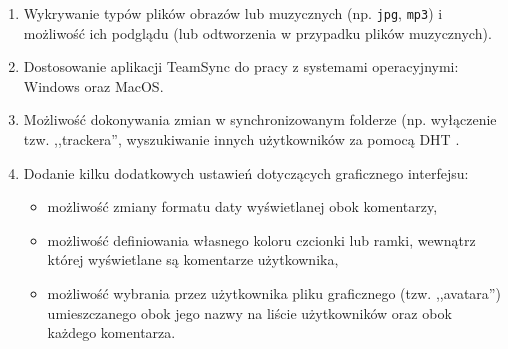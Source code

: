 \begin{enumerate}[noitemsep]
  \item Wykrywanie typów plików obrazów lub muzycznych (np. \texttt{jpg}, \texttt{mp3}) i możliwość ich podglądu (lub odtworzenia w przypadku plików muzycznych).
  
  \item Dostosowanie aplikacji TeamSync do pracy z systemami operacyjnymi: Windows oraz MacOS.
  
  \item Możliwość dokonywania zmian w synchronizowanym folderze (np. wyłączenie tzw. ,,trackera'', wyszukiwanie innych użytkowników za pomocą DHT \cite{dht}.
  
  \item Dodanie kilku dodatkowych ustawień dotyczących graficznego interfejsu:
  \begin{itemize}[noitemsep]
    \item możliwość zmiany formatu daty wyświetlanej obok komentarzy,
    \item możliwość definiowania własnego koloru czcionki lub ramki, wewnątrz której wyświetlane są komentarze użytkownika,
    \item możliwość wybrania przez użytkownika pliku graficznego (tzw. ,,avatara'') umieszczanego obok jego nazwy na liście użytkowników oraz obok każdego komentarza.
  \end{itemize}
\end{enumerate}